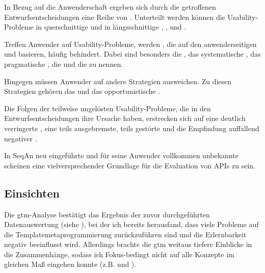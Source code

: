 In Bezug auf die Anwenderschaft ergeben sich durch die getroffenen Entwurfsentscheidungen eine Reihe von . Unterteilt werden können die Usability-Probleme in querschnittige  und in längsschnittige , ,  und .

Treffen Anwender auf Usability-Probleme, werden , die auf den anwenderseitigen  und  basieren, häufig behindert. Dabei sind besonders die , das systematische , das pragmatische , die  und die  zu nennen.

Hingegen müssen Anwender auf andere Strategien ausweichen. Zu diesen Strategien gehören das  und das opportunistische .%

Die Folgen der teilweise ungelösten Usability-Probleme, die in den Entwurfsentscheidungen ihre Ursache haben, erstrecken sich auf eine deutlich verringerte , eine teils ausgebremste, teils gestörte  und die Empfindung auffallend negativer .

In SeqAn neu eingeführte und für seine Anwender vollkommen unbekannte  scheinen eine vielversprechender Grundlage für die Evaluation von APIs zu sein.


\subsection{Einsichten}

Die \gls{gtm}-Analyse bestätigt das Ergebnis der zuvor durchgeführten Datenauswertung (siehe ), bei der ich bereits herausfand, dass viele Probleme auf die Templatemetaprogrammierung zurückzuführen sind und die Erlernbarkeit negativ beeinflusst wird. Allerdings brachte die \gls{gtm} weitaus tiefere Einblicke in die Zusammenhänge, sodass ich Fokus-bedingt nicht auf alle Konzepte im gleichen Maß eingehen konnte (z.B.  und  ).

